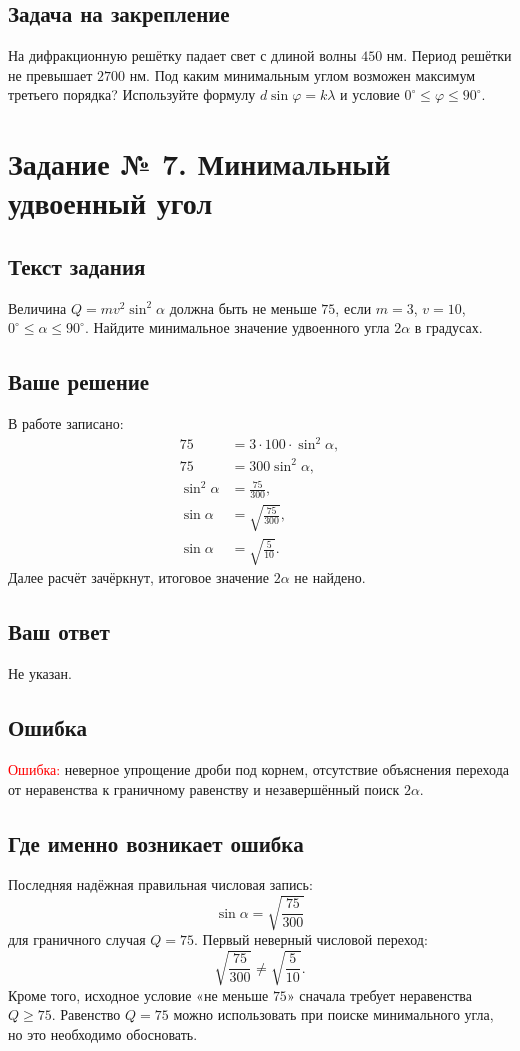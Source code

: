 \documentclass[12pt,a4paper]{article}
\begin{document}
\subsection*{Задача на закрепление}
На дифракционную решётку падает свет с длиной волны $450$ нм. Период решётки не превышает $2700$ нм. Под каким минимальным углом возможен максимум третьего порядка? Используйте формулу $d\sin\varphi=k\lambda$ и условие $0^\circ\le\varphi\le90^\circ$.

\clearpage
{}\label{task:7}
\section*{Задание № 7. Минимальный удвоенный угол}
\subsection*{Текст задания}
Величина $Q=mv^2\sin^2\alpha$ должна быть не меньше $75$, если $m=3$, $v=10$, $0^\circ\le\alpha\le90^\circ$. Найдите минимальное значение удвоенного угла $2\alpha$ в градусах.

\subsection*{Ваше решение}
В работе записано:
\begin{align*}
75&=3\cdot100\cdot\sin^2\alpha,\\
75&=300\sin^2\alpha,\\
\sin^2\alpha&=\frac{75}{300},\\
\sin\alpha&=\sqrt{\frac{75}{300}},\\
\sin\alpha&=\sqrt{\frac5{10}}.
\end{align*}
Далее расчёт зачёркнут, итоговое значение $2\alpha$ не найдено.

\subsection*{Ваш ответ}
Не указан.

\subsection*{Ошибка}
\textcolor{red}{Ошибка:} неверное упрощение дроби под корнем, отсутствие объяснения перехода от неравенства к граничному равенству и незавершённый поиск $2\alpha$.

\subsection*{Где именно возникает ошибка}
Последняя надёжная правильная числовая запись:
\[
\sin\alpha=\sqrt{\frac{75}{300}}
\]
для граничного случая $Q=75$. Первый неверный числовой переход:
\[
\sqrt{\frac{75}{300}}\ne\sqrt{\frac5{10}}.
\]
Кроме того, исходное условие «не меньше $75$» сначала требует неравенства $Q\ge75$. Равенство $Q=75$ можно использовать при поиске минимального угла, но это необходимо обосновать.
\end{document}
